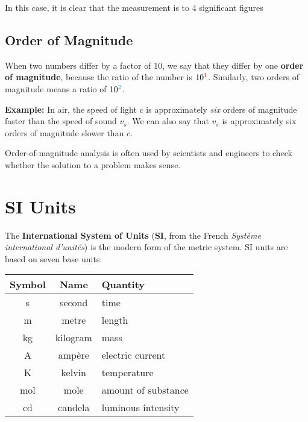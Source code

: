 In this case, it is clear that the measurement is to 4 significant figures  



\section{Order of Magnitude}

When two numbers differ by a factor of 10, we say that they differ by
{\color{red}one} \textbf{order of magnitude}, because the ratio of the number
is $10^{\color{red}1}$. Similarly, {\color{cyan}two} orders of magnitude
means a ratio of $10^{\color{cyan}2}$.

\textbf{Example:} In air, the speed of light $c$ is approximately \emph{six}
orders of magnitude faster than the speed of sound  $v_s$. We can also say that
$v_s$ is approximately six orders of magnitude slower than $c$.
%

Order-of-magnitude analysis is often used by scientists and engineers to
check whether the solution to a problem makes sense.



\chapter{SI Units}

The \textbf{International System of Units} (\textbf{SI}, from the French
\emph{Syst\`{e}me international d'unit\'{e}s}) is the modern form of the
metric system. SI units are based on seven base units:
%  
%

\begin{table}[ht]
  \centering
  \begin{tabular}{c|c|l}
    \textbf{Symbol} & \textbf{Name} & \textbf{Quantity} \\ \hline
    \si\second    & second  & time\\
    \si\metre     & metre   & length\\
    \si{\kilo\gram} & kilogram & mass\\
    \si\ampere    & amp\`{e}re  & electric current\\
    \si\kelvin    & kelvin  & temperature\\
    \si\mol       & mole    & amount of substance\\
    \si\candela   & candela & luminous intensity
  \end{tabular}
\end{table}  

